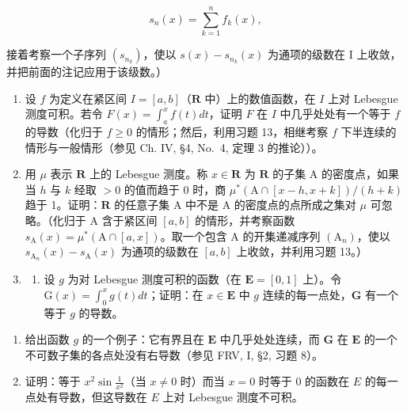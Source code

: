 \[
s _ {n} (x) = \sum_ {k = 1} ^ {n} f _ {k} (x),
\]

接着考察一个子序列 \((s_{n_k})\)，使以 \(s(x) - s_{n_k}(x)\) 为通项的级数在 I 上收敛，并把前面的注记应用于该级数。）

\begin{enumerate}
\def\labelenumi{\arabic{enumi})}
\setcounter{enumi}{13}
\item
  设 \(f\) 为定义在紧区间 \(I = [a, b]\)（\(\mathbf{R}\) 中）上的数值函数，在 \(I\) 上对 Lebesgue 测度可积。若令 \(F(x) = \int_{a}^{x} f(t) dt\)，证明 \(F\) 在 \(I\) 中几乎处处有一个等于 \(f\) 的导数（化归于 \(f \geqslant 0\) 的情形；然后，利用习题 13，相继考察 \(f\) 下半连续的情形与一般情形（参见 Ch. IV, §4, No.~4, 定理 3 的推论））。
\item
  用 \(\mu\) 表示 \(\mathbf{R}\) 上的 Lebesgue 测度。称 \(x \in \mathbf{R}\) 为 \(\mathbf{R}\) 的子集 A 的密度点，如果当 \(h\) 与 \(k\) 经取 \(>0\) 的值而趋于 0 时，商 \(\mu^{*}(\mathrm{A} \cap [x - h, x + k]) / (h + k)\) 趋于 1。证明：\(\mathbf{R}\) 的任意子集 A 中不是 A 的密度点的点所成之集对 \(\mu\) 可忽略。（化归于 A 含于紧区间 \([a, b]\) 的情形，并考察函数 \(s_{\mathrm{A}}(x) = \mu^{*}(\mathrm{A} \cap [a, x])\)。取一个包含 A 的开集递减序列 \((\mathrm{A}_n)\)，使以 \(s_{\mathrm{A}_n}(x) - s_{\mathrm{A}}(x)\) 为通项的级数在 \([a, b]\) 上收敛，并利用习题 13。）
\item
  \begin{enumerate}
  \def\labelenumii{\alph{enumii})}
  \tightlist
  \item
    设 \(g\) 为对 Lebesgue 测度可积的函数（在 \(\mathbf{E} = [0,1]\) 上）。令 \(\mathrm{G}(x) = \int_0^x g(t)dt\)；证明：在 \(x \in \mathbf{E}\) 中 \(g\) 连续的每一点处，\(\mathbf{G}\) 有一个等于 \(g\) 的导数。
  \end{enumerate}
\end{enumerate}

\begin{enumerate}
\def\labelenumi{\alph{enumi})}
\setcounter{enumi}{1}
\item
  给出函数 \(g\) 的一个例子：它有界且在 \(\mathbf{E}\) 中几乎处处连续，而 \(\mathbf{G}\) 在 \(\mathbf{E}\) 的一个不可数子集的各点处没有右导数（参见 FRV, I, §2, 习题 8）。
\item
  证明：等于 \(x^2 \sin \frac{1}{x^2}\)（当 \(x \neq 0\) 时）而当 \(x = 0\) 时等于 0 的函数在 \(E\) 的每一点处有导数，但这导数在 \(E\) 上对 Lebesgue 测度不可积。
\end{enumerate}

